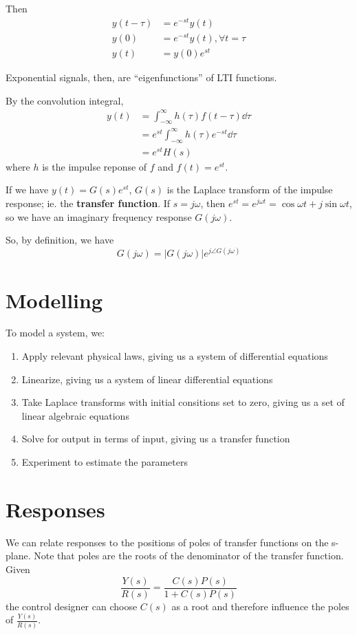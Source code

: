 \documentclass[12pt]{article}
\begin{document}
Then
\begin{align*}
y(t-\tau) &= e^{-st}y(t) \\
y(0) &= e^{-st} y(t), \forall t = \tau \\
y(t) &= y(0)e^{st}
\end{align*}

Exponential signals, then, are ``eigenfunctions'' of LTI functions.

By the convolution integral,
\begin{align*}
y(t) &= \int_{-\infty}^\infty h(\tau) f(t-\tau) \dd\tau \\
&= e^{st} \int_{-\infty}^\infty h(\tau) e^{-st} \dd\tau \\
&= e^{st} H(s)
\end{align*}
where $h$ is the impulse reponse of $f$ and $f(t) = e^{st}$.

If we have $y(t) = G(s)e^{st}$, $G(s)$ is the Laplace transform of the impulse response; ie. the {\bf transfer function}. If $s = j\omega$, then $e^{st} = e^{j\omega t} = \cos\omega t + j\sin\omega t$, so we have an imaginary frequency response $G(j\omega)$.

So, by definition, we have \[ G(j\omega) = \bigl| G(j\omega) \bigl| e^{j\angle G(j\omega)} \]

\section{Modelling}
To model a system, we:
\begin{enumerate}
\item Apply relevant physical laws, giving us a system of differential equations
\item Linearize, giving us a system of linear differential equations
\item Take Laplace transforms with initial consitions set to zero, giving us a set of linear algebraic equations
\item Solve for output in terms of input, giving us a transfer function
\item Experiment to estimate the parameters
\end{enumerate}

\section{Responses}
We can relate responses to the positions of poles of transfer functions on the s-plane. Note that poles are the roots of the denominator of the transfer function. Given \[ \frac{Y(s)}{R(s)} = \frac{C(s)P(s)}{1 + C(s)P(s)} \] the control designer can choose $C(s)$ as a root and therefore influence the poles of $\frac{Y(s)}{R(s)}$.
\end{document}
